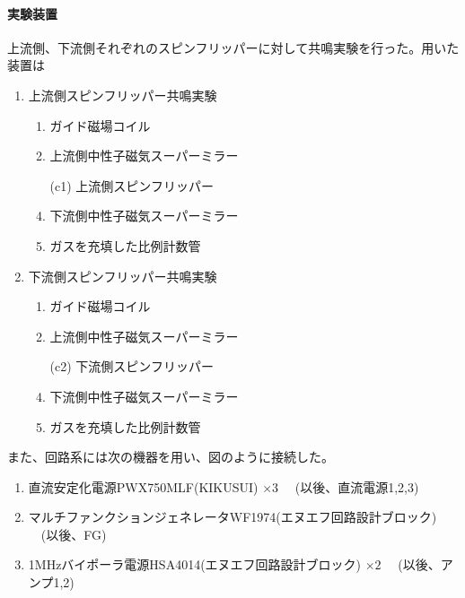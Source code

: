 \paragraph{実験装置}
上流側、下流側それぞれのスピンフリッパーに対して共鳴実験を行った。用いた装置は
\vspace{5mm}
\begin{minipage}{0.5\hsize}
\begin{enumerate}
\item 上流側スピンフリッパー共鳴実験
\begin{enumerate}
\item ガイド磁場コイル
\item 上流側中性子磁気スーパーミラー
\item[(c1)] 上流側スピンフリッパー
\setcounter{enumii}{3}
\item 下流側中性子磁気スーパーミラー
\item {}ガスを充填した比例計数管
\end{enumerate}
\end{enumerate}
\end{minipage}
\begin{minipage}{0.5\hsize}
\begin{enumerate}
\setcounter{enumi}{1}
\item 下流側スピンフリッパー共鳴実験
\begin{enumerate}
\item ガイド磁場コイル
\item 上流側中性子磁気スーパーミラー
\item[(c2)] 下流側スピンフリッパー
\setcounter{enumii}{3}
\item 下流側中性子磁気スーパーミラー
\item {}ガスを充填した比例計数管
\end{enumerate}
\end{enumerate}
\end{minipage}
\vspace{5mm}

また、回路系には次の機器を用い、図のように接続した。
\begin{enumerate}
\renewcommand{\labelenumi}{(\roman{enumi})}
\item 直流安定化電源PWX750MLF(KIKUSUI) $\times 3$ \ \ (以後、直流電源1,2,3)
\item マルチファンクションジェネレータWF1974(エヌエフ回路設計ブロック) \ \ (以後、FG)
\item 1MHzバイポーラ電源HSA4014(エヌエフ回路設計ブロック) $\times 2$ \ \ (以後、アンプ1,2)
\end{enumerate}

